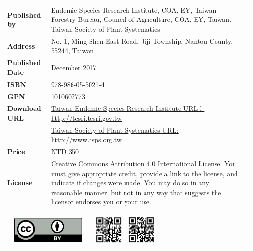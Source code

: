 \begin{table}[H]
{\begin{tabular}{>{\raggedleft\arraybackslash}p{2.5cm}p{9cm}p{3cm}}
      \textbf{Published by}       & Endemic Species Research Institute, COA, EY, Taiwan.
                                    Forestry Bureau, Council of Agriculture, COA, EY, Taiwan.
                                    Taiwan Society of Plant Systematics  & \\
      \textbf{Address}            & No. 1, Ming-Shen East Road, Jiji Township, Nantou County, 55244, Taiwan  & \\
      \textbf{Published Date}     & December 2017  & \\
      \textbf{ISBN}               & 978-986-05-5021-4  & \\
      \textbf{GPN}                & 1010602773  & \\
      \textbf{Download URL}  & \href{http://tesri.tesri.gov.tw}{Taiwan Endemic Species Research Institute URL：http://tesri.tesri.gov.tw}  & \\
                                  & \href{http://www.tsps.org.tw}{Taiwan Society of Plant Systematics URL: http://www.tsps.org.tw}  & \\
      \textbf{Price}              & NTD 350  & \\
      \textbf{License}            & \href{https://creativecommons.org/licenses/by/4.0}{Creative Commons Attribution 4.0 International License}.
                                     You must give appropriate credit, provide a link to the license,
                                     and indicate if changes were made. You may do so in any reasonable manner,
                                     but not in any way that suggests the licensor endorses you or your use.  & \\
  \end{tabular}
  }
  \begin{tabular}{p{2.5cm}p{3cm}p{1.0cm}p{1.6cm}p{1.6cm}}
    & \includegraphics[width=10em]{images/ccby40.png} & &
    \includegraphics[width=1.4cm]{images/tesri.png} &
    \includegraphics[width=1.4cm]{images/tsps.png} \\
  \end{tabular}

\end{table}
